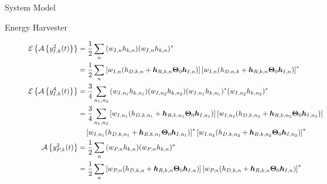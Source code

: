 \documentclass{IEEEtran}
\begin{document}
\begin{section} {System Model}
\begin{subsection}	{Energy Harvester}
\begin{figure*}[b]
			\begin{align}
				\mathcal{E}\left\{\mathcal{A}\left\{y_{I,k}^2(t)\right\}\right\}
				 & =\frac{1}{2}\sum_n{(w_{I,n}h_{k,n})(w_{I,n}h_{k,n})^*}\label{eq:E{A{y_{I,k}**2}}}                                                                                                                                                                                                                                               \\
				 & =\frac{1}{2}\sum_n{\left[w_{I,n}(h_{D,k,n}+\boldsymbol{h}_{R,k,n}\boldsymbol{\Theta}_0\boldsymbol{h}_{I,n})\right]\left[w_{I,n}(h_{D,n,k}+\boldsymbol{h}_{R,k,n}\boldsymbol{\Theta}_0\boldsymbol{h}_{I,n})\right]^*}                                                                                                            \\
				\mathcal{E}\left\{\mathcal{A}\left\{y_{I,k}^4(t)\right\}\right\}
				 & =\frac{3}{4}\sum_{{n_1},{n_2}}{(w_{I,{n_1}}h_{k,{n_1}})(w_{I,{n_2}}h_{k,{n_2}})(w_{I,{n_1}}h_{k,{n_1}})^*(w_{I,{n_2}}h_{k,{n_2}})^*}                                                                                                                                                                                            \\
				 & =\frac{3}{4}\sum_{{n_1},{n_2}}\left[w_{I,{n_1}}(h_{D,k,n_1}+\boldsymbol{h}_{R,k,n_1}\boldsymbol{\Theta}_0\boldsymbol{h}_{I,n_1})\right]\left[w_{I,{n_2}}(h_{D,k,n_2}+\boldsymbol{h}_{R,k,n_2}\boldsymbol{\Theta}_0\boldsymbol{h}_{I,n_2})\right]\nonumber                                                                       \\
				 & \quad\left[w_{I,{n_1}}(h_{D,k,n_1}+\boldsymbol{h}_{R,k,n_1}\boldsymbol{\Theta}_0\boldsymbol{h}_{I,n_1})\right]^*\left[w_{I,{n_2}}(h_{D,k,n_2}+\boldsymbol{h}_{R,k,n_2}\boldsymbol{\Theta}_0\boldsymbol{h}_{I,n_2})\right]^*                                                                                                     \\
				\mathcal{A}\left\{y_{P,k}^2(t)\right\}
				 & =\frac{1}{2}\sum_n{(w_{P,n}h_{k,n})(w_{P,n}h_{k,n})^*}                                                                                                                                                                                                                                                                          \\
				 & =\frac{1}{2}\sum_n{\left[w_{P,n}(h_{D,k,n}+\boldsymbol{h}_{R,k,n}\boldsymbol{\Theta}_0\boldsymbol{h}_{I,n})\right]\left[w_{P,n}(h_{D,k,n}+\boldsymbol{h}_{R,k,n}\boldsymbol{\Theta}_0\boldsymbol{h}_{I,n})\right]^*}                                                                                                            \\

\end{align}
\end{figure*}
\end{subsection}
\end{section}
\end{document}
